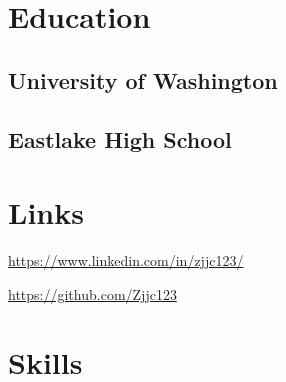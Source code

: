 \documentclass[]{main}
\begin{document}
%
%

%
%

%
%

\begin{minipage}[t]{0.33\textwidth} 

\vspace{5pt}
\section{Education} 

\subsection{University of Washington}
\sectionsep

\subsection{Eastlake High School}
\sectionsep


\section{Links} 

\href{https://www.linkedin.com/in/zjjc123/}{https://www.linkedin.com/in/zjjc123/} \\

\href{https://github.com/Zjjc123}{https://github.com/Zjjc123} \\


\sectionsep

\section{Skills}


\end{minipage}
\end{document}
